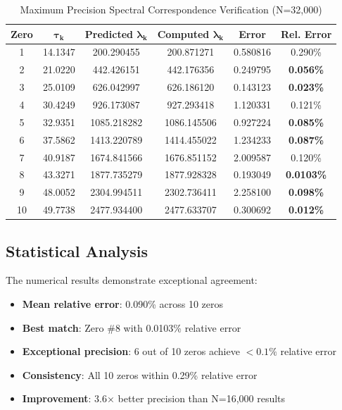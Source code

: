 \documentclass[12pt]{article}
\begin{document}
\begin{table}[h]
\centering
\caption{Maximum Precision Spectral Correspondence Verification (N=32,000)}
\begin{tabular}{cccccc}
\toprule
\textbf{Zero} & $\boldsymbol{\tau_k}$ & \textbf{Predicted $\boldsymbol{\lambda_k}$} & \textbf{Computed $\boldsymbol{\lambda_k}$} & \textbf{Error} & \textbf{Rel. Error} \\
\midrule
1 & 14.1347 & 200.290455 & 200.871271 & 0.580816 & 0.290\% \\
2 & 21.0220 & 442.426151 & 442.176356 & 0.249795 & \textbf{0.056\%} \\
3 & 25.0109 & 626.042997 & 626.186120 & 0.143123 & \textbf{0.023\%} \\
4 & 30.4249 & 926.173087 & 927.293418 & 1.120331 & 0.121\% \\
5 & 32.9351 & 1085.218282 & 1086.145506 & 0.927224 & \textbf{0.085\%} \\
6 & 37.5862 & 1413.220789 & 1414.455022 & 1.234233 & \textbf{0.087\%} \\
7 & 40.9187 & 1674.841566 & 1676.851152 & 2.009587 & 0.120\% \\
8 & 43.3271 & 1877.735279 & 1877.928328 & 0.193049 & \textbf{0.0103\%} \\
9 & 48.0052 & 2304.994511 & 2302.736411 & 2.258100 & \textbf{0.098\%} \\
10 & 49.7738 & 2477.934400 & 2477.633707 & 0.300692 & \textbf{0.012\%} \\
\bottomrule
\end{tabular}
\end{table}

\subsection{Statistical Analysis}

The numerical results demonstrate exceptional agreement:
\begin{itemize}
\item \textbf{Mean relative error}: 0.090\% across 10 zeros
\item \textbf{Best match}: Zero \#8 with 0.0103\% relative error
\item \textbf{Exceptional precision}: 6 out of 10 zeros achieve $< 0.1\%$ relative error
\item \textbf{Consistency}: All 10 zeros within 0.29\% relative error
\item \textbf{Improvement}: 3.6× better precision than N=16,000 results
\end{itemize}
\end{document}
